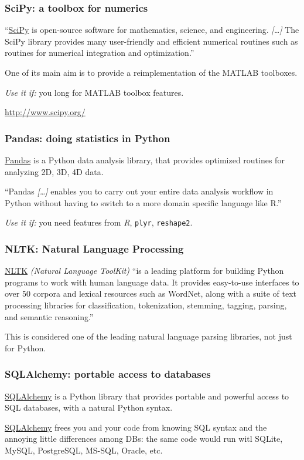 \documentclass[english,serif,mathserif,xcolor=pdftex,dvipsnames,table]{beamer}
\begin{document}
\begin{frame}
  \frametitle{SciPy: a toolbox for numerics}

  ``\href{http://www.scipy.org}{SciPy} is open-source software for
  mathematics, science, and engineering. \emph{[\ldots]} The SciPy
  library provides many user-friendly and efficient numerical routines
  such as routines for numerical integration and optimization.''

  \+ One of its main aim is to provide a reimplementation of the
  MATLAB toolboxes.

  \+ \emph{Use it if:} you long for MATLAB toolbox features.

  \begin{seealso}
    \url{http://www.scipy.org/}
  \end{seealso}
\end{frame}


\begin{frame}
  \frametitle{Pandas: doing statistics in Python}

  \href{http://pandas.pydata.org/}{Pandas} is a Python data analysis
  library, that provides optimized routines for analyzing 2D, 3D, 4D
  data.

  \+ ``Pandas \emph{[\ldots]} enables you to carry out your entire
  data analysis workflow in Python without having to switch to a more
  domain specific language like R.''

  \+ \emph{Use it if:} you need features from \emph{R}, \texttt{plyr},
  \texttt{reshape2}.
\end{frame}


\begin{frame}
  \frametitle{NLTK: Natural Language Processing}

  \href{http://nltk.org/}{NLTK} \emph{(Natural Language ToolKit)} ``is
  a leading platform for building Python programs to work with human
  language data. It provides easy-to-use interfaces to over 50 corpora
  and lexical resources such as WordNet, along with a suite of text
  processing libraries for classification, tokenization, stemming,
  tagging, parsing, and semantic reasoning.''

  \+ This is considered one of the leading natural language parsing
  libraries, not just for Python.
\end{frame}


\begin{frame}
  \frametitle{SQLAlchemy: portable access to databases}

  \href{http://www.sqlalchemy.org/}{SQLAlchemy} is a Python library
  that provides portable and powerful access to SQL databases, with a
  natural Python syntax.

  \+ \href{http://www.sqlalchemy.org/}{SQLAlchemy} frees you and your
  code from knowing SQL syntax and the annoying little differences
  among DBs: the same code would run witl SQLite, MySQL, PostgreSQL,
  MS-SQL, Oracle, etc.
\end{frame}
\end{document}
